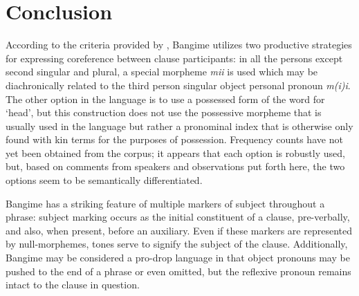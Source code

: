 \documentclass[output=paper]{langscibook}
\begin{document}
\section{Conclusion}
\label{sec:conc}
According to the criteria provided by \cite{Haspelmath2019}, Bangime utilizes two productive strategies for expressing coreference between clause participants: in all the persons except second singular and plural, a special morpheme \textit{mii} is used which may be diachronically related to the third person singular object personal pronoun \textit{m(i)i}. The other option in the language is to use a possessed form of the word for `head', but this construction does not use the possessive morpheme that is usually used in the language but rather a pronominal index that is otherwise only found with kin terms for the purposes of possession. Frequency counts have not yet been obtained from the corpus; it appears that each option is robustly used, but, based on comments from speakers and observations put forth here, the two options seem to be semantically differentiated.

Bangime has a striking feature of multiple markers of subject throughout a phrase: subject marking occurs as the initial constituent of a clause, pre-verbally, and also, when present, before an auxiliary. Even if these markers are represented by null-morphemes, tones serve to signify the subject of the clause. Additionally, Bangime may be considered a pro-drop language in that object pronouns may be pushed to the end of a phrase or even omitted, but the reflexive pronoun remains intact to the clause in question.

\end{document}
